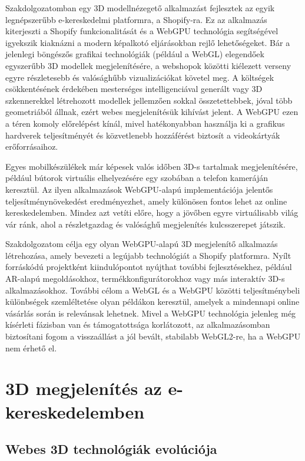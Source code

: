 \documentclass[12pt]{report}
\begin{document}
        Szakdolgozatomban egy 3D modellnézegető alkalmazást fejlesztek az egyik legnépszerűbb e-kereskedelmi platformra, a Shopify-ra. Ez az alkalmazás kiterjeszti a Shopify funkcionalitását és a WebGPU technológia segítségével igyekszik kiaknázni a modern képalkotó eljárásokban rejlő lehetőségeket. Bár a jelenlegi böngészős grafikai technológiák (például a WebGL) elegendőek egyszerűbb 3D modellek megjelenítésére, a webshopok közötti kiélezett verseny egyre részletesebb és valósághűbb vizualizációkat követel meg. A költségek csökkentésének érdekében mesterséges intelligenciával generált vagy 3D szkennerekkel létrehozott modellek jellemzően sokkal összetettebbek, jóval több geometriából állnak, ezért webes megjelenítésük kihívást jelent. A WebGPU ezen a téren komoly előrelépést kínál, mivel hatékonyabban használja ki a grafikus hardverek teljesítményét és közvetlenebb hozzáférést biztosít a videokártyák erőforrásaihoz.
        
        Egyes mobilkészülékek már képesek valós időben 3D-s tartalmak megjelenítésére, például bútorok virtuális elhelyezésére egy szobában a telefon kameráján keresztül. Az ilyen alkalmazások WebGPU-alapú implementációja jelentős teljesítménynövekedést eredményezhet, amely különösen fontos lehet az online kereskedelemben. Mindez azt vetíti előre, hogy a jövőben egyre virtuálisabb világ vár ránk, ahol a részletgazdag és valósághű megjelenítés kulcsszerepet játszik.
        
        Szakdolgozatom célja egy olyan WebGPU-alapú 3D megjelenítő alkalmazás létrehozása, amely bevezeti a legújabb technológiát a Shopify platformra. Nyílt forráskódú projektként kiindulópontot nyújthat további fejlesztésekhez, például AR-alapú megoldásokhoz, termékkonfigurátorokhoz vagy más interaktív 3D-s alkalmazásokhoz. További célom a WebGL és a WebGPU közötti teljesítménybeli különbségek szemléltetése olyan példákon keresztül, amelyek a mindennapi online vásárlás során is relevánsak lehetnek. Mivel a WebGPU technológia jelenleg még kísérleti fázisban van és támogatottsága korlátozott, az alkalmazásomban biztosítani fogom a visszaállást a jól bevált, stabilabb WebGL2-re, ha a WebGPU nem érhető el.
        
	    \chapter{3D megjelenítés az e-kereskedelemben}
        \section{Webes 3D technológiák evolúciója}
\end{document}
